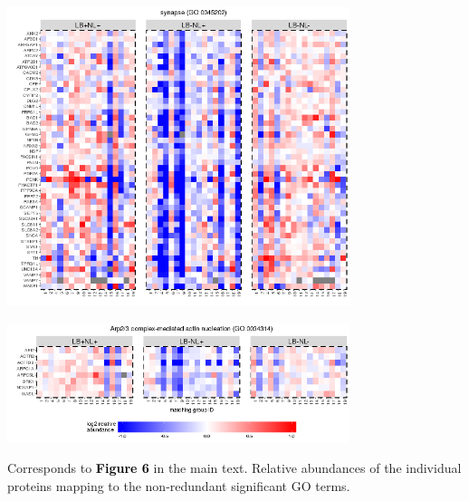 \documentclass[11pt]{article}\usepackage[]{graphicx}\usepackage[usenames,dvipsnames]{color}
\newenvironment{knitrout}{}{} %
\begin{document}
\begin{knitrout}
\color{fgcolor}

{\centering \includegraphics[width=0.75\textwidth]{figure/toppath_heatmaps_2-1} 

}



\end{knitrout}
\begin{knitrout}
\color{fgcolor}

{\centering \includegraphics[width=0.75\textwidth]{figure/toppath_heatmaps_1-1} 

}



\end{knitrout}
Corresponds to
\textcolor{black}{\colorbox{highlighter}{\textbf{Figure 6}}} in the main text.
Relative abundances of the individual proteins mapping to the non-redundant 
significant GO terms.



\clearpage


\end{document}
